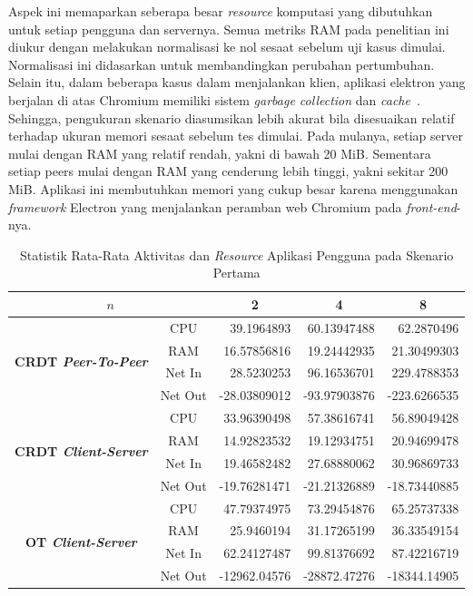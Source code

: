 Aspek ini memaparkan seberapa besar \textit{resource} komputasi yang dibutuhkan untuk setiap pengguna dan servernya. Semua metriks RAM pada penelitian ini diukur dengan melakukan normalisasi ke nol sesaat sebelum uji kasus dimulai. Normalisasi ini didasarkan untuk membandingkan perubahan pertumbuhan. Selain itu, dalam beberapa kasus dalam menjalankan klien, aplikasi elektron yang berjalan di atas Chromium memiliki sistem \textit{garbage collection} dan \textit{cache}~\citep{chromium}. Sehingga, pengukuran skenario diasumsikan lebih akurat bila disesuaikan relatif terhadap ukuran memori sesaat sebelum tes dimulai. Pada mulanya, setiap server mulai dengan RAM yang relatif rendah, yakni di bawah 20 MiB. Sementara setiap peers mulai dengan RAM yang cenderung lebih tinggi, yakni sekitar 200 MiB. Aplikasi ini membutuhkan memori yang cukup besar karena menggunakan \textit{framework} Electron yang menjalankan peramban web Chromium pada \textit{front-end}-nya.

\begin{table}[H]
 \centering

 \caption{Statistik Rata-Rata Aktivitas dan \textit{Resource} Aplikasi Pengguna pada Skenario Pertama}
 \label{tab:resource-client-1}
 \begin{tabular}{|cc|r|r|r|}
  \hline
\multicolumn{2}{|c|}{$n$} & \multicolumn{1}{c|}{\textbf{2}} & \multicolumn{1}{c|}{\textbf{4}} & \multicolumn{1}{c|}{\textbf{8}} \\ \hline
\multicolumn{1}{|c|}{\multirow{4}{*}{\textbf{CRDT \textit{Peer-To-Peer}}}} & CPU & 39.1964893 & 60.13947488 & 62.2870496 \\ \cline{2-5}
\multicolumn{1}{|c|}{} & RAM & 16.57856816 & 19.24442935 & 21.30499303 \\ \cline{2-5}
\multicolumn{1}{|c|}{} & Net In & 28.5230253 & 96.16536701 & 229.4788353 \\ \cline{2-5}
\multicolumn{1}{|c|}{} & Net Out & -28.03809012 & -93.97903876 & -223.6266535 \\ \hline
\multicolumn{1}{|c|}{\multirow{4}{*}{\textbf{CRDT \textit{Client-Server}}}} & CPU & 33.96390498 & 57.38616741 & 56.89049428 \\ \cline{2-5}
\multicolumn{1}{|c|}{} & RAM & 14.92823532 & 19.12934751 & 20.94699478 \\ \cline{2-5}
\multicolumn{1}{|c|}{} & Net In & 19.46582482 & 27.68880062 & 30.96869733 \\ \cline{2-5}
\multicolumn{1}{|c|}{} & Net Out & -19.76281471 & -21.21326889 & -18.73440885 \\ \hline
\multicolumn{1}{|c|}{\multirow{4}{*}{\textbf{OT \textit{Client-Server}}}} & CPU & 47.79374975 & 73.29454876 & 65.25737338 \\ \cline{2-5}
\multicolumn{1}{|c|}{} & RAM & 25.9460194 & 31.17265199 & 36.33549154 \\ \cline{2-5}
\multicolumn{1}{|c|}{} & Net In & 62.24127487 & 99.81376692 & 87.42216719 \\ \cline{2-5}
\multicolumn{1}{|c|}{} & Net Out & -12962.04576 & -28872.47276 & -18344.14905 \\ \hline
\end{tabular}
\end{table}

